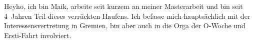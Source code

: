 \begin{multicols*}{2}
{Heyho, ich bin Maik, arbeite seit kurzem an meiner Masterarbeit und bin seit 4~Jahren Teil dieses verrückten Haufens.
Ich befasse mich hauptsächlich mit der Interessensvertretung in Gremien, bin aber auch in die Orga der O-Woche und Ersti-Fahrt involviert.}


\end{multicols*}
